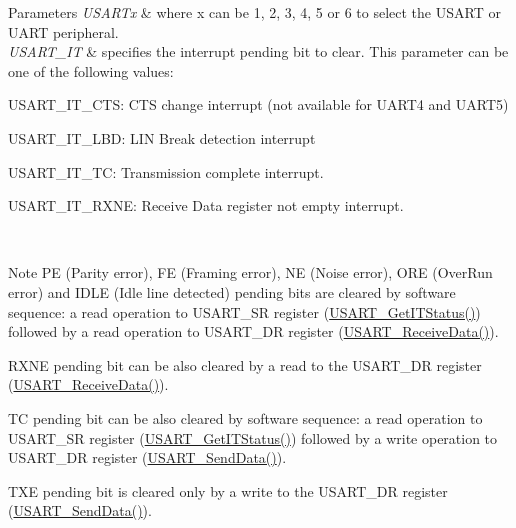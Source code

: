 \begin{DoxyParams}{Parameters}
{\em U\+S\+A\+R\+Tx} & where x can be 1, 2, 3, 4, 5 or 6 to select the U\+S\+A\+RT or U\+A\+RT peripheral. \\
\hline
{\em U\+S\+A\+R\+T\+\_\+\+IT} & specifies the interrupt pending bit to clear. This parameter can be one of the following values\+: \begin{DoxyItemize}
\item U\+S\+A\+R\+T\+\_\+\+I\+T\+\_\+\+C\+TS\+: C\+TS change interrupt (not available for U\+A\+R\+T4 and U\+A\+R\+T5) \item U\+S\+A\+R\+T\+\_\+\+I\+T\+\_\+\+L\+BD\+: L\+IN Break detection interrupt \item U\+S\+A\+R\+T\+\_\+\+I\+T\+\_\+\+TC\+: Transmission complete interrupt. \item U\+S\+A\+R\+T\+\_\+\+I\+T\+\_\+\+R\+X\+NE\+: Receive Data register not empty interrupt.\end{DoxyItemize}
\\
\hline
\end{DoxyParams}
\begin{DoxyNote}{Note}
PE (Parity error), FE (Framing error), NE (Noise error), O\+RE (Over\+Run error) and I\+D\+LE (Idle line detected) pending bits are cleared by software sequence\+: a read operation to U\+S\+A\+R\+T\+\_\+\+SR register (\hyperlink{group___u_s_a_r_t___group9_ga93d8f031241bcdbe938d091a85295445}{U\+S\+A\+R\+T\+\_\+\+Get\+I\+T\+Status()}) followed by a read operation to U\+S\+A\+R\+T\+\_\+\+DR register (\hyperlink{group___u_s_a_r_t___group2_gac67a91845b0b1d54d31bdfb1c5e9867c}{U\+S\+A\+R\+T\+\_\+\+Receive\+Data()}). 

R\+X\+NE pending bit can be also cleared by a read to the U\+S\+A\+R\+T\+\_\+\+DR register (\hyperlink{group___u_s_a_r_t___group2_gac67a91845b0b1d54d31bdfb1c5e9867c}{U\+S\+A\+R\+T\+\_\+\+Receive\+Data()}). 

TC pending bit can be also cleared by software sequence\+: a read operation to U\+S\+A\+R\+T\+\_\+\+SR register (\hyperlink{group___u_s_a_r_t___group9_ga93d8f031241bcdbe938d091a85295445}{U\+S\+A\+R\+T\+\_\+\+Get\+I\+T\+Status()}) followed by a write operation to U\+S\+A\+R\+T\+\_\+\+DR register (\hyperlink{group___u_s_a_r_t___group2_ga0b43d42da9540f446d494bf69823c6fb}{U\+S\+A\+R\+T\+\_\+\+Send\+Data()}). 

T\+XE pending bit is cleared only by a write to the U\+S\+A\+R\+T\+\_\+\+DR register (\hyperlink{group___u_s_a_r_t___group2_ga0b43d42da9540f446d494bf69823c6fb}{U\+S\+A\+R\+T\+\_\+\+Send\+Data()}).
\end{DoxyNote}

